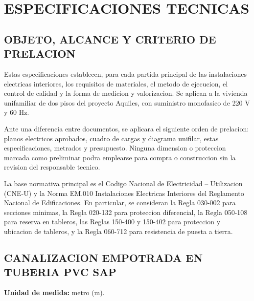 \chapter*{ESPECIFICACIONES TECNICAS}

\setcounter{section}{0}
\renewcommand{\thesection}{3.\arabic{section}.}
\renewcommand{\thesubsection}{3.\arabic{section}.\arabic{subsection}.}
\renewcommand{\theHsection}{especificaciones.\arabic{section}}
\renewcommand{\theHsubsection}{especificaciones.\arabic{section}.\arabic{subsection}}

\section{OBJETO, ALCANCE Y CRITERIO DE PRELACION}

Estas especificaciones establecen, para cada partida principal de las instalaciones
electricas interiores, los requisitos de materiales, el metodo de ejecucion, el control
de calidad y la forma de medicion y valorizacion. Se aplican a la vivienda unifamiliar
de dos pisos del proyecto Aquiles, con suministro monofasico de 220 V y 60 Hz.

Ante una diferencia entre documentos, se aplicara el siguiente orden de prelacion:
planos electricos aprobados, cuadro de cargas y diagrama unifilar, estas
especificaciones, metrados y presupuesto. Ninguna dimension o proteccion marcada como
preliminar podra emplearse para compra o construccion sin la revision del responsable
tecnico.

La base normativa principal es el Codigo Nacional de Electricidad -- Utilizacion
(CNE-U) y la Norma EM.010 Instalaciones Electricas Interiores del Reglamento Nacional
de Edificaciones. En particular, se consideran la Regla 030-002 para secciones minimas,
la Regla 020-132 para proteccion diferencial, la Regla 050-108 para reserva en tableros,
las Reglas 150-400 y 150-402 para proteccion y ubicacion de tableros, y la Regla
060-712 para resistencia de puesta a tierra.

\section{CANALIZACION EMPOTRADA EN TUBERIA PVC SAP}

\textbf{Unidad de medida:} metro (m).


